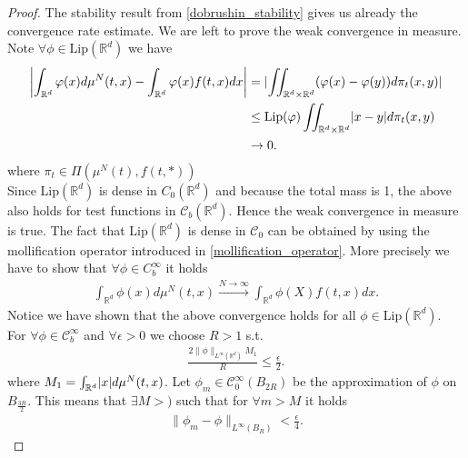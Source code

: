 \begin{proof}
  The stability result from  \autoref{dobrushin_stability} gives us already the convergence rate estimate. We are left 
  to prove the weak convergence in measure. Note $\forall \phi \in \text{Lip}(\mathbb{R}^{d} )$ we have
  \begin{align*}
    \abs*{\int_{\mathbb{R}^{d} }\phi(x)d\mu ^{N}(t,x) -\int_{\mathbb{R}^{d}}\phi(x)f(t,x) dx} &= \abs{\iint_{\mathbb{R}^{d} \times  \mathbb{R}^{d}  } (\phi(x) - \phi(y)) d\pi_t(x,y)}\\
                                                                                              &\le \text{Lip}(\phi ) \iint_{\mathbb{R}^{d}\times \mathbb{R}^{d}  }\abs{x-y}d\pi_t(x,y)\\
                                                                                              &\to 0
  .\end{align*}
  where $\pi_t \in  \Pi(\mu ^{N}(t),f(t,*) )$\\[1ex]
  Since $\text{Lip}(\mathbb{R}^{d} )$ is dense in $C_{0}(\mathbb{R}^{d} )$ and because the total mass is 1, the above also holds for test functions in 
  $\mathcal{C}_b(\mathbb{R}^{d} )$. Hence the weak convergence in measure is true. The fact that $\text{Lip}(\mathbb{R}^{d} )$ is dense in $\mathcal{C}_0$ 
  can be obtained by using the mollification operator introduced in \autoref{mollification_operator}. More precisely we have to show that $\forall  \phi \in C_b^{\infty} $ it holds 
  \begin{align*}
    \int_{\mathbb{R}^{d} }\phi(x) d\mu ^{N}(t,x)  \xrightarrow{N\to \infty} \int_{\mathbb{R}^{d} }\phi(X)f(t,x)dx
  .\end{align*}
  Notice we have shown that the above convergence holds for all $\phi  \in  \text{Lip}(\mathbb{R}^{d} )$.\\[1ex]
  For $\forall \phi  \in  \mathcal{C}_b^{\infty} $ and $\forall \epsilon > 0$ we choose $R>1$ s.t.
  \begin{align*}
    \frac{2 \|\phi \|_{L^{\infty}(\mathbb{R}^{d} ) }M_1}{R} \le  \frac{\epsilon}{2}
  .\end{align*}
  where $M_{1} = \int_{\mathbb{R}^{d} } \abs{x} d\mu ^{N}(t,x) $. Let $\phi_m \in \mathcal{C}_0^{\infty}(B_{2R}) $ be the approximation of $\phi $ on $B_{\frac{3R}{2}}$. This means
  that $\exists  M > )$ such that for $\forall m > M$ it holds 
  \begin{align*}
    \|\phi_m - \phi \|_{L^{\infty}(B_R) } < \frac{\epsilon}{4}
  .\end{align*}

\end{proof}
